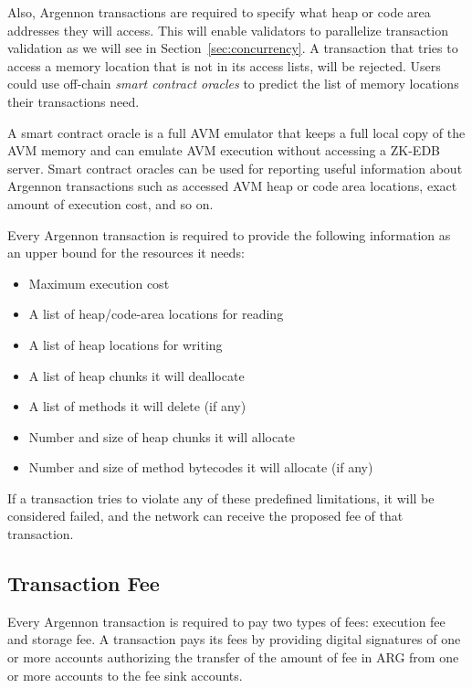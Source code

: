 Also, Argennon transactions are required to specify what heap or code area addresses they will access. This will
enable validators to parallelize transaction validation as we will see in Section~\ref{sec:concurrency}. A transaction
that tries to access a memory location that is not in its access lists, will be rejected.
Users could use off-chain \emph{smart contract oracles} to predict the list of memory locations their transactions need.

A smart contract oracle is a full AVM emulator that keeps a full local copy of the AVM memory and can emulate AVM
execution without accessing a ZK-EDB server. Smart contract oracles can be used for reporting useful information about
Argennon transactions such as accessed AVM heap or code area locations, exact amount of execution cost,
and so on.

Every Argennon transaction is required to provide the following information as an upper bound for the
resources it needs:

\begin{itemize}
    \item Maximum execution cost
    \item A list of heap/code-area locations for reading
    \item A list of heap locations for writing
    \item A list of heap chunks it will deallocate
    \item A list of methods it will delete (if any)
    \item Number and size of heap chunks it will allocate
    \item Number and size of method bytecodes it will allocate (if any)
\end{itemize}

If a transaction tries to violate any of these predefined limitations, it will be considered failed, and the network
can receive the proposed fee of that transaction.

\subsection{Transaction Fee}\label{subsec:fee}

Every Argennon transaction is required to pay two types of fees: execution fee and storage fee. A transaction pays
its fees by providing digital signatures of one or more accounts authorizing the transfer of the amount of fee in
ARG from one or more accounts to the fee sink accounts.

